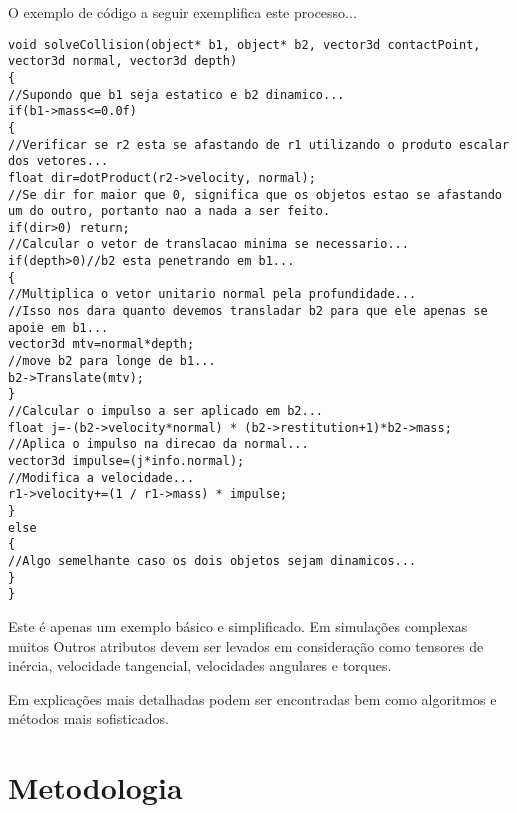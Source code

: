 O exemplo de código a seguir exemplifica este processo...


\begin{lstlisting}[frame=single,caption=Exemplo de resolução de colisão\label{code:solveCollision}]
void solveCollision(object* b1, object* b2, vector3d contactPoint, vector3d normal, vector3d depth)
{
//Supondo que b1 seja estatico e b2 dinamico...
if(b1->mass<=0.0f)
{
//Verificar se r2 esta se afastando de r1 utilizando o produto escalar dos vetores...
float dir=dotProduct(r2->velocity, normal);
//Se dir for maior que 0, significa que os objetos estao se afastando um do outro, portanto nao a nada a ser feito.
if(dir>0) return;
//Calcular o vetor de translacao minima se necessario...
if(depth>0)//b2 esta penetrando em b1...
{
//Multiplica o vetor unitario normal pela profundidade...
//Isso nos dara quanto devemos transladar b2 para que ele apenas se apoie em b1...
vector3d mtv=normal*depth;
//move b2 para longe de b1...
b2->Translate(mtv);
}
//Calcular o impulso a ser aplicado em b2...
float j=-(b2->velocity*normal) * (b2->restitution+1)*b2->mass;
//Aplica o impulso na direcao da normal...
vector3d impulse=(j*info.normal);
//Modifica a velocidade...
r1->velocity+=(1 / r1->mass) * impulse;
}
else
{
//Algo semelhante caso os dois objetos sejam dinamicos...
}
}
\end{lstlisting}

Este é apenas um exemplo básico e simplificado. Em simulações complexas muitos
Outros atributos devem ser levados em consideração como tensores de inércia,
velocidade tangencial, velocidades angulares e torques.

Em  explicações mais detalhadas podem ser encontradas bem como algoritmos e
métodos mais sofisticados.


\section{Metodologia}

